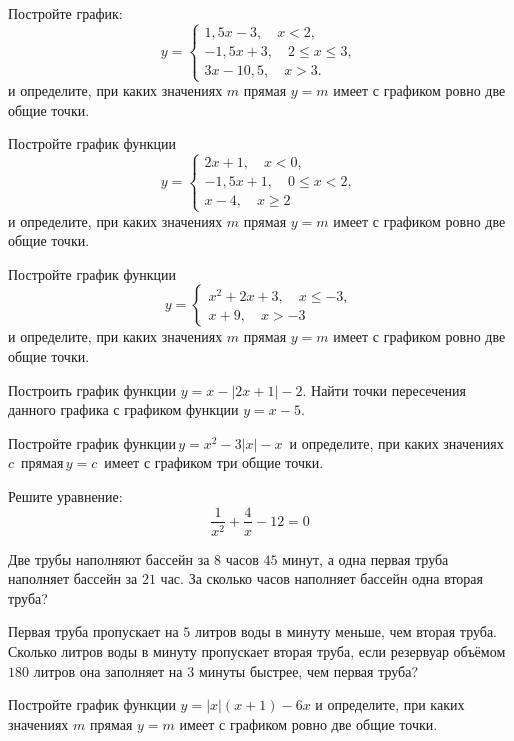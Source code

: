 \begin{class}[number=4]
	\begin{listofex}
		\item Постройте график:
		\[ y=	 \left\{
		\begin{array}{l}
			1,5x-3, \quad x<2,\\
			-1,5x+3, \quad 2\leq x\leq3,\\
			3x-10,5, \quad x>3.
		\end{array}
		\right. \]
		и определите, при каких значениях \( m \) прямая \( y=m \) имеет с графиком ровно две общие точки.
		\item  Постройте график функции
		\[y=	 \left\{
		\begin{array}{l}
			2x+1, \quad x<0,\\
			-1,5x+1, \quad 0\leq x<2,\\
			x-4, \quad x\geq 2
		\end{array}
		\right. \]
		и определите, при каких значениях \( m \) прямая \( y=m \) имеет с графиком ровно две общие точки.
		\item Постройте график функции
		\[y=	 \left\{
		\begin{array}{l}
			x^2+2x+3, \quad x\leq-3,\\
			x+9, \quad x>-3
		\end{array}
		\right. \]
		и определите, при каких значениях \( m \) прямая \( y=m \) имеет с графиком ровно две общие точки.
		\item Построить график функции \( y=x-|2x+1|-2 \). Найти точки пересечения данного графика с графиком функции \( y=x-5 \).
		\item Постройте график функции \( y=x^2-3|x|-x \)  и определите, при каких значениях \( c \)  прямая \( y=c \)  имеет с графиком три общие точки.
	\end{listofex}
\end{class}

\begin{homework}[number=2]
	\begin{listofex}
		\item Решите уравнение: \[\dfrac{1}{x^2}+\dfrac{4}{x}-12=0\]
		\item Две трубы наполняют бассейн за \( 8 \) часов \( 45 \) минут, а одна первая труба наполняет бассейн за \( 21 \) час. За сколько часов наполняет бассейн одна вторая труба?
		\item Первая труба пропускает на \( 5 \) литров воды в минуту меньше, чем вторая труба. Сколько литров воды в минуту пропускает вторая труба, если резервуар объёмом \( 180 \) литров она заполняет на \( 3 \) минуты быстрее, чем первая труба?
		\item Постройте график функции \( y=|x|(x+1)-6x \) и определите, при каких значениях \( m \) прямая \( y=m \) имеет с графиком ровно две общие точки.
	\end{listofex}
\end{homework}

